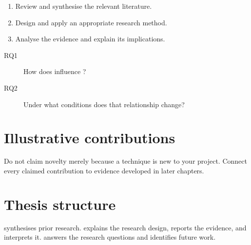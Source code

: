 \begin{enumerate}
  \item Review and synthesise the relevant literature.
  \item Design and apply an appropriate research method.
  \item Analyse the evidence and explain its implications.
\end{enumerate}

\begin{description}
  \item[RQ1] How does  influence ?
  \item[RQ2] Under what conditions does that relationship change?
\end{description}

\section{Illustrative contributions}


Do not claim novelty merely because a technique is new to your project. Connect every
claimed contribution to evidence developed in later chapters.

\section{Thesis structure}
 synthesises prior research.  explains the
research design,  reports the evidence, and 
interprets it.  answers the research questions and identifies
future work.
